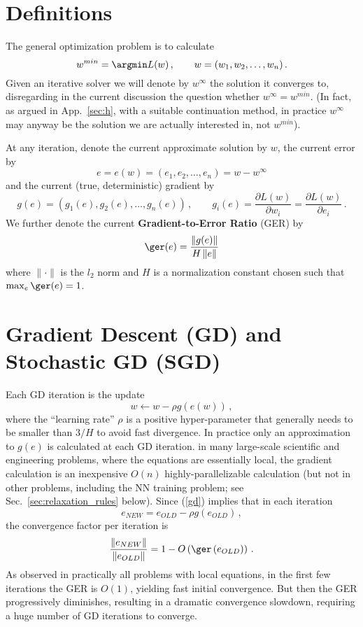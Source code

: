 \documentclass{article} %
\begin{document}

\section{Definitions}
\label{sec:definitions}
The general optimization problem is to calculate
$$
	w^{min} = \argmin L(w)\,,\qquad w = (w_1, w_2,\dots, w_n)\,.
$$
Given an iterative solver we will denote by $w^{\infty}$ the solution it converges to, disregarding in the current discussion the question whether $w^{\infty} = w^{min}$. (In fact, as argued in App.~\ref{sec:h}, with a suitable continuation method, in practice $w^{\infty}$ may anyway be the solution we are actually interested in, not $w^{min}$).

At any iteration, denote the current approximate solution by $w$, the current error by
\begin{equation}
	e = e(w) = (e_1, e_2, \dots, e_n) = w - w^{\infty}
	\label{error}
\end{equation}
and the current (true, deterministic) gradient by
$$
	g(e) = \left(g_1(e), g_2(e), \dots, g_n(e)\right)\,,\qquad g_i(e) = \frac{\partial L(w)}{\partial w_i} = \frac{\partial L(w)}{\partial e_i}\,.
$$
We further denote the current \textbf{Gradient-to-Error Ratio} (GER) by
\begin{equation}
	\ger(e) = \frac{\left\| g(e) \right\|}{H \left\| e \right\|}
	\label{ger}
\end{equation}
where $\|\cdot\|$ is the $l_2$ norm and $H$ is a normalization constant chosen such that $\max_e \ger(e) = 1$.

\section{Gradient Descent (GD) and Stochastic GD (SGD)}
\label{sec:gd}

Each GD iteration is the update
\begin{equation}
	w \longleftarrow w - \rho g\left(e(w)\right)\,,
	\label{gd}
\end{equation}
where the ``learning rate'' $\rho$ is a positive hyper-parameter that generally needs to be smaller than $3 / H$ to avoid fast divergence. In practice only an approximation to $g(e)$ is calculated at each GD iteration. in many large-scale scientific and engineering problems, where the equations are essentially local, the gradient calculation is an inexpensive $O(n)$ highly-parallelizable calculation (but not in other problems, including the NN training problem; see Sec.~\ref{sec:relaxation_rules} below). Since (\ref{gd}) implies that in each iteration
$$
	e_{NEW} = e_{OLD} - \rho g\left(e_{OLD}\right)\,,
$$
the convergence factor per iteration is
$$
	\frac{\left\|e_{NEW}\right\|}{\left\|e_{OLD}\right\|} = 1 - O\left(\ger\left(e_{OLD}\right)\right)\,.
$$
As observed in practically all problems with local equations, in the first few iterations the GER is $O(1)$, yielding fast initial convergence. But then the GER progressively diminishes, resulting in a dramatic convergence slowdown, requiring a huge number of GD iterations to converge.
\end{document}
